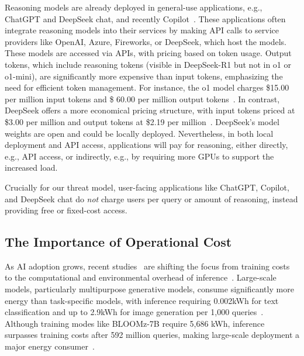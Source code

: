 Reasoning models are already deployed in general-use applications, e.g., ChatGPT and DeepSeek chat, and recently Copilot~\cite{verge_microsoft_o1_copilot_2025}. These applications often integrate reasoning models into their services by making API calls to service providers like OpenAI, Azure, Fireworks, or DeepSeek, which host the models. These models are accessed via APIs, with pricing based on token usage. Output tokens, which include reasoning tokens (visible in DeepSeek-R1 but not in o1 or o1-mini), are significantly more expensive than input tokens, emphasizing the need for efficient token management. For instance, the o1 model charges \$15.00 per million input tokens and \$ 60.00 per million output tokens~\citep{openai_pricing}. In contrast, DeepSeek offers a more economical pricing structure, with input tokens priced at \$3.00 per million and output tokens at \$2.19 per million~\citep{deepseek_pricing}. DeepSeek's model weights are open and could be locally deployed. Nevertheless,   in both local deployment and API access, applications will pay for reasoning, either directly, e.g., API access, or indirectly, e.g., by requiring more GPUs to support the increased load. 

Crucially for our threat model, user-facing applications like ChatGPT, Copilot, and DeepSeek chat do \emph{not} charge users per query or amount of reasoning, instead providing free or fixed-cost access.









\subsection{The Importance of Operational Cost}

As AI adoption grows, recent studies~\citep{samsi2023words, luccioni2024power, varoquaux2024hype} are shifting the focus from training costs to the computational and environmental overhead of inference~\citep{samsi2023words}. Large-scale models, particularly multipurpose generative models, consume significantly more energy than task-specific models, with inference requiring 0.002kWh for text classification and up to 2.9kWh for image generation per 1,000 queries~\citep{luccioni2024power}. Although training modes like BLOOMz-7B require 5,686 kWh, inference surpasses training costs after 592 million queries, making large-scale deployment a major energy consumer~\citep{patterson2022carbon}. 









